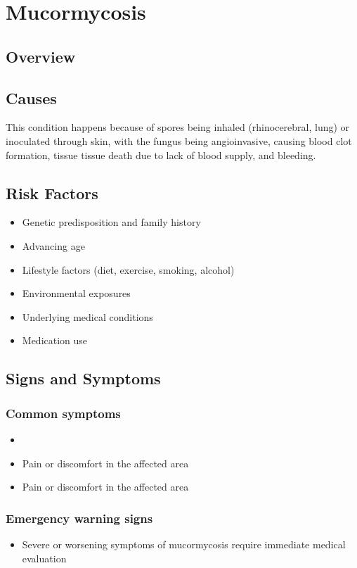 \chapter{Mucormycosis}
\label{sec:Mucormycosis}

\section{Overview}

\section{Causes}
This condition happens because of spores being inhaled (rhinocerebral, lung) or inoculated through skin, with the fungus being angioinvasive, causing blood clot formation, tissue tissue death due to lack of blood supply, and bleeding.     
\section{Risk Factors}

\begin{itemize}[noitemsep]
  \item Genetic predisposition and family history
  \item Advancing age
  \item Lifestyle factors (diet, exercise, smoking, alcohol)
  \item Environmental exposures
  \item Underlying medical conditions
  \item Medication use
\end{itemize}
\section{Signs and Symptoms}

\subsection{Common symptoms}
\begin{itemize}[noitemsep]
  \item \item Pain or discomfort in the affected area    \item Pain or discomfort in the affected area
  \end{itemize}

\subsection{Emergency warning signs}
\begin{itemize}[noitemsep]
  \item Severe or worsening symptoms of mucormycosis require immediate medical evaluation
\end{itemize}
